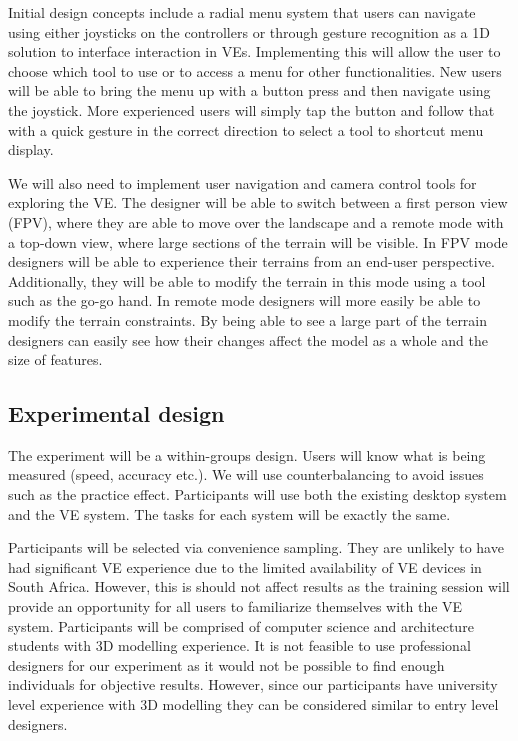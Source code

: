 \documentclass{sig-alternate-05-2015}
\begin{document}
Initial design concepts include a radial menu system that users can navigate using either joysticks on the controllers or through gesture recognition as a 1D solution to interface interaction in VEs\cite{Hand1997}. Implementing this will allow the user to choose which tool to use or to access a menu for other functionalities. New users will be able to bring the menu up with a button press and then navigate using the joystick. More experienced users will simply tap the button and follow that with a quick gesture in the correct direction to select a tool to shortcut menu display.

We will also need to implement user navigation and camera control tools for exploring the VE. The designer will be able to switch between a first person view (FPV), where they are able to move over the landscape and a remote mode with a top-down view, where large sections of the terrain will be visible. In FPV mode designers will be able to experience their terrains from an end-user perspective. Additionally, they will be able to modify the terrain in this mode using a tool such as the go-go hand\cite{Poupyrev1996}. In remote mode designers will more easily be able to modify the terrain constraints. By being able to see a large part of the terrain designers can easily see how their changes affect the model as a whole and the size of features.


\subsection{Experimental design}
The experiment will be a within-groups design. Users will know what is being measured (speed, accuracy etc.). We will use counterbalancing to avoid issues such as the practice effect. Participants will use both the existing desktop system and the VE system. The tasks for each system will be exactly the same.

Participants will be selected via convenience sampling. They are unlikely to have had significant VE experience due to the limited availability of VE devices in South Africa. However, this is should not affect results as the training session will provide an opportunity for all users to familiarize themselves with the VE system. Participants will be comprised  of computer science and architecture students with 3D modelling experience. It is not feasible to use professional designers for our experiment as it would not be possible to find enough individuals for objective results. However, since our participants have university level experience with 3D modelling they can be considered similar to entry level designers.
\end{document}
